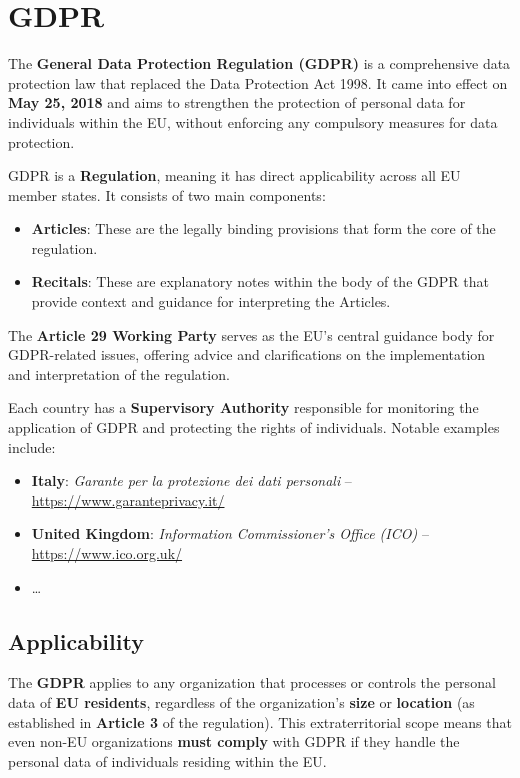 \chapter{GDPR}

The \textbf{General Data Protection Regulation (GDPR)} is a
comprehensive data protection law that replaced the Data Protection
Act 1998. It came into effect on \textbf{May 25, 2018} and aims to
strengthen the protection of personal data for individuals within the
EU, without enforcing any compulsory measures for data protection.

GDPR is a \textbf{Regulation}, meaning it has direct applicability
across all EU member states. It consists of two main components:
\begin{itemize}
    \item \textbf{Articles}: These are the legally binding provisions
      that form the core of the regulation.
    \item \textbf{Recitals}: These are explanatory notes within the
      body of the GDPR that provide context and guidance for
      interpreting the Articles.
\end{itemize}

The \textbf{Article 29 Working Party} serves as the EU's central
guidance body for GDPR-related issues, offering advice and
clarifications on the implementation and interpretation of the
regulation.

Each country has a \textbf{Supervisory Authority} responsible for
monitoring the application of GDPR and protecting the rights of
individuals. Notable examples include:
\begin{itemize}
    \item \textbf{Italy}: \textit{Garante per la protezione dei dati
      personali} – \url{https://www.garanteprivacy.it/}
    \item \textbf{United Kingdom}: \textit{Information Commissioner's
      Office (ICO)} – \url{https://www.ico.org.uk/}
    \item \dots
\end{itemize}

\section{Applicability}

The \textbf{GDPR} applies to any organization that processes or
controls the personal data of \textbf{EU residents}, regardless of the
organization's \textbf{size} or \textbf{location} (as established in
\textbf{Article 3} of the regulation). This extraterritorial scope
means that even non-EU organizations \textbf{must comply} with GDPR if
they handle the personal data of individuals residing within the EU.

